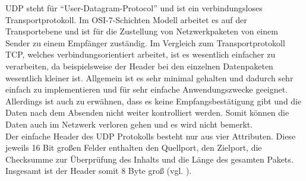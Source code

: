 \ac{UDP} steht für ``User-Datagram-Protocol'' und ist ein verbindungsloses Transportprotokoll. Im \ac{OSI}-7-Schichten Modell arbeitet es auf der Transportebene und ist für die Zustellung von Netzwerkpaketen von einem Sender zu einem Empfänger zuständig. Im Vergleich zum Transportprotokoll \ac{TCP}, welches verbindungsorientiert arbeitet, ist es wesentlich einfacher zu verarbeiten, da beispielsweise der Header bei den einzelnen Datenpaketen wesentlich kleiner ist. Allgemein ist es sehr minimal gehalten und dadurch sehr einfach zu implementieren und für sehr einfache Anwendungszwecke geeignet. Allerdings ist auch zu erwähnen, dass es keine Empfangsbestätigung gibt und die Daten nach dem Absenden nicht weiter kontrolliert werden. Somit können die Daten auch im Netzwerk verloren gehen und es wird nicht bemerkt. \\
Der einfache Header des \ac{UDP} Protokolls besteht nur aus vier Attributen. Diese jeweils 16 Bit großen Felder enthalten den Quellport, den Zielport, die Checksumme zur Überprüfung des Inhalts und die Länge des gesamten Pakets. Insgesamt ist der Header somit 8 Byte groß (vgl. \cite{ElektronikKompendium.}\cite{.}\cite{.23.02.2016}).
 